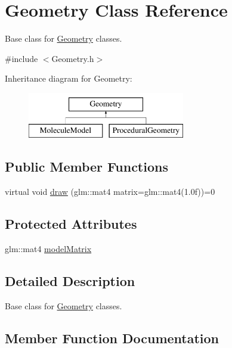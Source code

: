 \hypertarget{class_geometry}{}\section{Geometry Class Reference}
\label{class_geometry}


Base class for \mbox{\hyperlink{class_geometry}{Geometry}} classes.  




{\ttfamily \#include $<$Geometry.\+h$>$}

Inheritance diagram for Geometry\+:\begin{figure}[H]
\begin{center}
\leavevmode
\includegraphics[height=2.000000cm]{class_geometry}
\end{center}
\end{figure}
\subsection*{Public Member Functions}
\begin{DoxyCompactItemize}
\item 
virtual void \mbox{\hyperlink{class_geometry_a417f18c0d1f3c8a09ee93023c0a8330d}{draw}} (glm\+::mat4 matrix=glm\+::mat4(1.\+0f))=0
\end{DoxyCompactItemize}
\subsection*{Protected Attributes}
\begin{DoxyCompactItemize}
\item 
glm\+::mat4 \mbox{\hyperlink{class_geometry_a03134a55079f6ca6ff750f31869f645e}{model\+Matrix}}
\end{DoxyCompactItemize}


\subsection{Detailed Description}
Base class for \mbox{\hyperlink{class_geometry}{Geometry}} classes. 



\subsection{Member Function Documentation}
\mbox{\label{class_geometry_a417f18c0d1f3c8a09ee93023c0a8330d}} 
